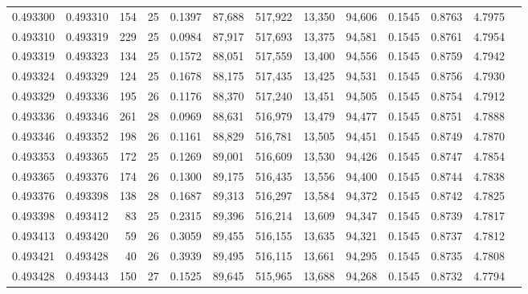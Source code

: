 \begin{tabular}{rrrrrrrrrrrrr}
0.493300 & 0.493310 & 154 &  25 &                                     0.1397 &  87,688 & 517,922 &  13,350 &  94,606 & 0.1545 & 0.8763 & 4.7975 \\
0.493310 & 0.493319 & 229 &  25 &                                     0.0984 &  87,917 & 517,693 &  13,375 &  94,581 & 0.1545 & 0.8761 & 4.7954 \\
0.493319 & 0.493323 & 134 &  25 &                                     0.1572 &  88,051 & 517,559 &  13,400 &  94,556 & 0.1545 & 0.8759 & 4.7942 \\
0.493324 & 0.493329 & 124 &  25 &                                     0.1678 &  88,175 & 517,435 &  13,425 &  94,531 & 0.1545 & 0.8756 & 4.7930 \\
0.493329 & 0.493336 & 195 &  26 &                                     0.1176 &  88,370 & 517,240 &  13,451 &  94,505 & 0.1545 & 0.8754 & 4.7912 \\
0.493336 & 0.493346 & 261 &  28 &                                     0.0969 &  88,631 & 516,979 &  13,479 &  94,477 & 0.1545 & 0.8751 & 4.7888 \\
0.493346 & 0.493352 & 198 &  26 &                                     0.1161 &  88,829 & 516,781 &  13,505 &  94,451 & 0.1545 & 0.8749 & 4.7870 \\
0.493353 & 0.493365 & 172 &  25 &                                     0.1269 &  89,001 & 516,609 &  13,530 &  94,426 & 0.1545 & 0.8747 & 4.7854 \\
0.493365 & 0.493376 & 174 &  26 &                                     0.1300 &  89,175 & 516,435 &  13,556 &  94,400 & 0.1545 & 0.8744 & 4.7838 \\
0.493376 & 0.493398 & 138 &  28 &                                     0.1687 &  89,313 & 516,297 &  13,584 &  94,372 & 0.1545 & 0.8742 & 4.7825 \\
0.493398 & 0.493412 &  83 &  25 &                                     0.2315 &  89,396 & 516,214 &  13,609 &  94,347 & 0.1545 & 0.8739 & 4.7817 \\
0.493413 & 0.493420 &  59 &  26 &                                     0.3059 &  89,455 & 516,155 &  13,635 &  94,321 & 0.1545 & 0.8737 & 4.7812 \\
0.493421 & 0.493428 &  40 &  26 &                                     0.3939 &  89,495 & 516,115 &  13,661 &  94,295 & 0.1545 & 0.8735 & 4.7808 \\
0.493428 & 0.493443 & 150 &  27 &                                     0.1525 &  89,645 & 515,965 &  13,688 &  94,268 & 0.1545 & 0.8732 & 4.7794 \\

\end{tabular}
